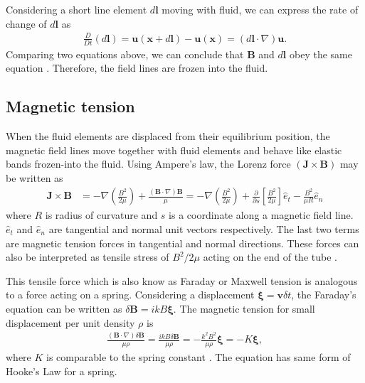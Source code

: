 \documentclass{jfm}
\newcommand{\del}{\nabla}
\begin{document}
Considering a short line element $d\mathbf{l}$ moving with fluid, we can express 
the rate of change of $d\mathbf{l}$ as
\begin{align}
    \frac{D}{Dt}\left(d\mathbf{l}\right) = \mathbf{u}(\mathbf{x}+d\mathbf{l})-\mathbf{u}(\mathbf{x})=(d\mathbf{l}\cdot\del)\mathbf{u}.
\end{align}
Comparing two equations above, we can conclude that $\mathbf{B}$ and 
$d\mathbf{l}$ obey the same equation \cite[see][]{Davidson2001}. Therefore, the 
field lines are frozen into the fluid.


%
%
\subsection{Magnetic tension}

When the fluid elements are displaced from their equilibrium position, the 
magnetic field lines move together with fluid elements and behave like elastic
bands frozen-into the fluid. Using Ampere's law, the Lorenz force 
$(\mathbf{J}\times\mathbf{B})$ may be written as
\begin{align}
    \mathbf{J}\times\mathbf{B} &= - \del\left(\frac{B^2}{2\mu}\right) +\frac{(\mathbf{B}\cdot \del)\mathbf{B}}{\mu}
    =- \del\left(\frac{B^2}{2\mu}\right)+\frac{\partial}{\partial s} \left[\frac{B^2}{2\mu}\right]\hat{e}_t - \frac{B^2}{\mu R}\hat{e}_n
\end{align} 
where $R$ is radius of curvature and $s$ is a coordinate along a magnetic 
field line. $\hat{e}_t$ and $\hat{e}_n$ are tangential and normal unit vectors 
respectively. The last two terms are magnetic tension forces in tangential and 
normal directions. These forces can also be interpreted as tensile stress of 
$B^2/2\mu$ acting on the end of the tube \cite[see][]{Davidson2001}. 

This tensile force which is also know as Faraday or Maxwell tension is 
analogous to a force acting on a spring. Considering a displacement 
$\boldsymbol{\xi}=\mathbf{v}\delta t$, the Faraday's equation can be written 
as $\delta \mathbf{B} = ikB\boldsymbol{\xi}$. The magnetic tension for small 
displacement per unit density $\rho$ is
\begin{align}
    \frac{(\mathbf{B}\cdot\del)\delta \mathbf{B}}{\mu \rho}=\frac{ikB\delta \mathbf{B}}{\mu \rho} = -\frac{k^2 B^2}{\mu\rho} \boldsymbol{\xi} = -K \boldsymbol{\xi},
\end{align}
where $K$ is comparable to the spring constant \cite[see][]{Wiki:MRI,Balbus1998}. The 
equation has same form of Hooke's Law for a spring.
\end{document}
